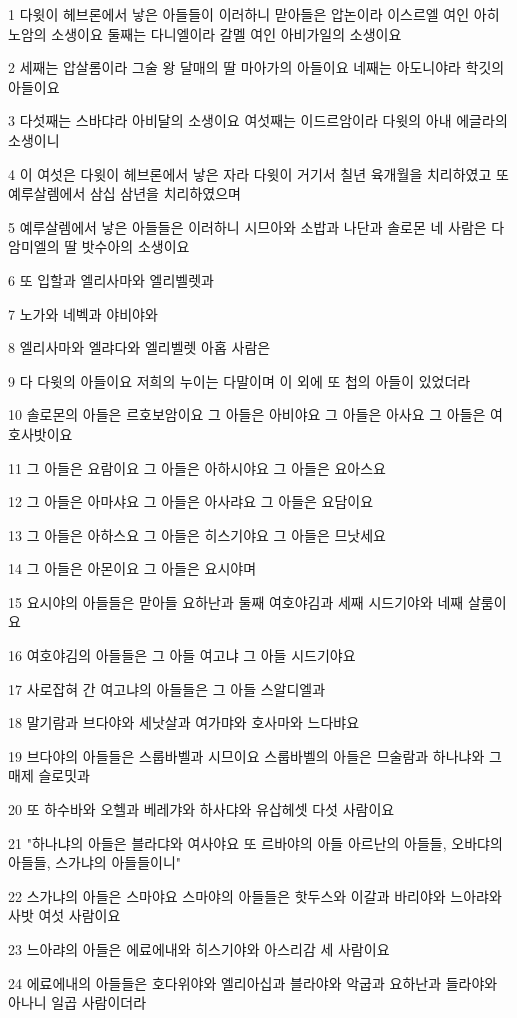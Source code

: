 \par 1 다윗이 헤브론에서 낳은 아들들이 이러하니 맏아들은 압논이라 이스르엘 여인 아히노암의 소생이요 둘째는 다니엘이라 갈멜 여인 아비가일의 소생이요
\par 2 세째는 압살롬이라 그술 왕 달매의 딸 마아가의 아들이요 네째는 아도니야라 학깃의 아들이요
\par 3 다섯째는 스바댜라 아비달의 소생이요 여섯째는 이드르암이라 다윗의 아내 에글라의 소생이니
\par 4 이 여섯은 다윗이 헤브론에서 낳은 자라 다윗이 거기서 칠년 육개월을 치리하였고 또 예루살렘에서 삼십 삼년을 치리하였으며
\par 5 예루살렘에서 낳은 아들들은 이러하니 시므아와 소밥과 나단과 솔로몬 네 사람은 다 암미엘의 딸 밧수아의 소생이요
\par 6 또 입할과 엘리사마와 엘리벨렛과
\par 7 노가와 네벡과 야비야와
\par 8 엘리사마와 엘랴다와 엘리벨렛 아홉 사람은
\par 9 다 다윗의 아들이요 저희의 누이는 다말이며 이 외에 또 첩의 아들이 있었더라
\par 10 솔로몬의 아들은 르호보암이요 그 아들은 아비야요 그 아들은 아사요 그 아들은 여호사밧이요
\par 11 그 아들은 요람이요 그 아들은 아하시야요 그 아들은 요아스요
\par 12 그 아들은 아마샤요 그 아들은 아사랴요 그 아들은 요담이요
\par 13 그 아들은 아하스요 그 아들은 히스기야요 그 아들은 므낫세요
\par 14 그 아들은 아몬이요 그 아들은 요시야며
\par 15 요시야의 아들들은 맏아들 요하난과 둘째 여호야김과 세째 시드기야와 네째 살룸이요
\par 16 여호야김의 아들들은 그 아들 여고냐 그 아들 시드기야요
\par 17 사로잡혀 간 여고냐의 아들들은 그 아들 스알디엘과
\par 18 말기람과 브다야와 세낫살과 여가먀와 호사마와 느다뱌요
\par 19 브다야의 아들들은 스룹바벨과 시므이요 스룹바벨의 아들은 므술람과 하나냐와 그 매제 슬로밋과
\par 20 또 하수바와 오헬과 베레갸와 하사댜와 유삽헤셋 다섯 사람이요
\par 21 "하나냐의 아들은 블라댜와 여사야요 또 르바야의 아들 아르난의 아들들, 오바댜의 아들들, 스가냐의 아들들이니"
\par 22 스가냐의 아들은 스마야요 스마야의 아들들은 핫두스와 이갈과 바리야와 느아랴와 사밧 여섯 사람이요
\par 23 느아랴의 아들은 에료에내와 히스기야와 아스리감 세 사람이요
\par 24 에료에내의 아들들은 호다위야와 엘리아십과 블라야와 악굽과 요하난과 들라야와 아나니 일곱 사람이더라

